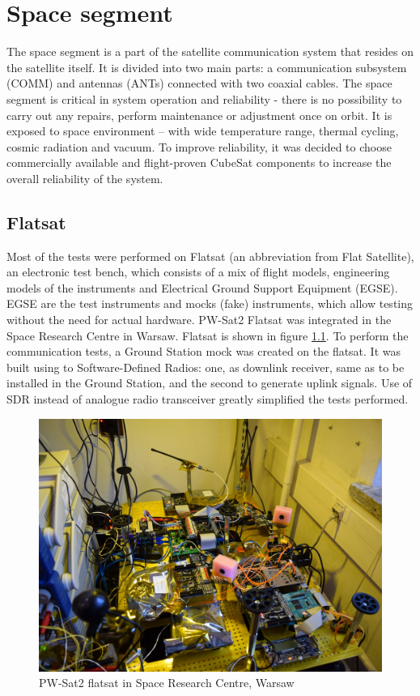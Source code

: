 \chapter{Space segment}
The space segment is a part of the satellite communication system that resides on the satellite itself. It is divided into two main parts: a communication subsystem (COMM) and antennas (ANTs) connected with two coaxial cables. The space segment is critical in system operation and reliability - there is no possibility to carry out any repairs, perform maintenance or adjustment once on orbit. It is exposed to space environment – with wide temperature range, thermal cycling, cosmic radiation and vacuum. To improve reliability, it was decided to choose commercially available and flight-proven CubeSat components to increase the overall reliability of the system.

\section{Flatsat}
Most of the tests were performed on Flatsat (an abbreviation from Flat Satellite), an electronic test bench, which consists of a mix of flight models, engineering models of the instruments and Electrical Ground Support Equipment (EGSE). EGSE are the test instruments and mocks (fake) instruments, which allow testing without the need for actual hardware. PW-Sat2 Flatsat was integrated in the Space Research Centre in Warsaw. Flatsat is shown in figure \ref{flatsat_photo}. To perform the communication tests, a Ground Station mock was created on the flatsat. It was built using to Software-Defined Radios: one, as downlink receiver, same as to be installed in the Ground Station, and the second to generate uplink signals. Use of SDR instead of analogue radio transceiver greatly simplified the tests performed.

\begin{figure}[H]
    \centering
    \includegraphics[width=0.48\paperwidth]{img/6/flatsat.jpg}
    \caption{PW-Sat2 flatsat in Space Research Centre, Warsaw}
    \label{flatsat_photo}
\end{figure}

